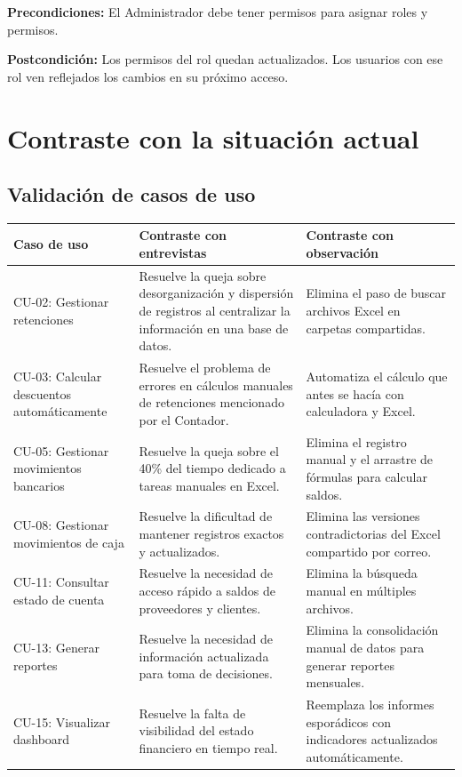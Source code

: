 \documentclass[stu]{apa7}
\begin{document}
\textbf{Precondiciones:} El Administrador debe tener permisos para asignar roles y permisos.

\textbf{Postcondición:} Los permisos del rol quedan actualizados. Los usuarios con ese rol ven reflejados los cambios en su próximo acceso.

\newpage

\section{Contraste con la situación actual}

\subsection{Validación de casos de uso}

\begin{longtable}{|L{4cm}|L{5cm}|L{5cm}|}
\hline
{}
\textbf{Caso de uso} & \textbf{Contraste con entrevistas} & \textbf{Contraste con observación} \\
\hline
\endhead
CU-02: Gestionar retenciones & Resuelve la queja sobre desorganización y dispersión de registros al centralizar la información en una base de datos. & Elimina el paso de buscar archivos Excel en carpetas compartidas. \\
\hline
CU-03: Calcular descuentos automáticamente & Resuelve el problema de errores en cálculos manuales de retenciones mencionado por el Contador. & Automatiza el cálculo que antes se hacía con calculadora y Excel. \\
\hline
CU-05: Gestionar movimientos bancarios & Resuelve la queja sobre el 40\% del tiempo dedicado a tareas manuales en Excel. & Elimina el registro manual y el arrastre de fórmulas para calcular saldos. \\
\hline
CU-08: Gestionar movimientos de caja & Resuelve la dificultad de mantener registros exactos y actualizados. & Elimina las versiones contradictorias del Excel compartido por correo. \\
\hline
CU-11: Consultar estado de cuenta & Resuelve la necesidad de acceso rápido a saldos de proveedores y clientes. & Elimina la búsqueda manual en múltiples archivos. \\
\hline
CU-13: Generar reportes & Resuelve la necesidad de información actualizada para toma de decisiones. & Elimina la consolidación manual de datos para generar reportes mensuales. \\
\hline
CU-15: Visualizar dashboard & Resuelve la falta de visibilidad del estado financiero en tiempo real. & Reemplaza los informes esporádicos con indicadores actualizados automáticamente. \\
\hline
\end{longtable}
\end{document}
